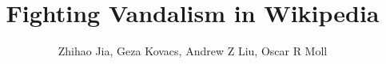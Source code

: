 \documentclass[12pt,a4paper]{article}
\begin{document}
\title{\textbf{Fighting Vandalism in Wikipedia}}
\author{
\large
Zhihao Jia,
Geza Kovacs,
Andrew Z Liu,
Oscar R Moll
\vspace{0.03in}\\
}
\date{}
\maketitle







\end{document}

